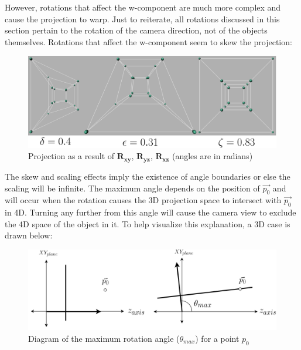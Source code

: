 \documentclass[12pt, letterpaper]{article}
\begin{document}
However, rotations that affect the w-component are much more complex and cause the projection to warp. Just to reiterate, all rotations discussed in this section pertain to the rotation of the camera direction, not of the objects themselves. Rotations that affect the w-component seem to skew the projection:
\begin{figure}[H]
\centering
\includegraphics[width=14cm]{rotation+with_w.png}
\caption{Projection as a result of $\mathbf{R_{xy}}$, $\mathbf{R_{yz}}$, $\mathbf{R_{xz}}$ (angles are in radians)}
\label{fig:figure}
\end{figure}
The skew and scaling effects imply the existence of angle boundaries or else the scaling will be infinite. The maximum angle depends on the position of $\vec{p_0}$ and will occur when the rotation causes the 3D projection space to intersect with $\vec{p_0}$ in 4D. Turning any further from this angle will cause the camera view to exclude the 4D space of the object in it. To help visualize this explanation, a 3D case is drawn below:
\begin{figure}[H]
\centering
\includegraphics[width=12cm]{max_rotation.png}
\caption{Diagram of the maximum rotation angle ($\theta_{max}$) for a point $p_0$}
\label{fig:figure}
\end{figure}
\end{document}
